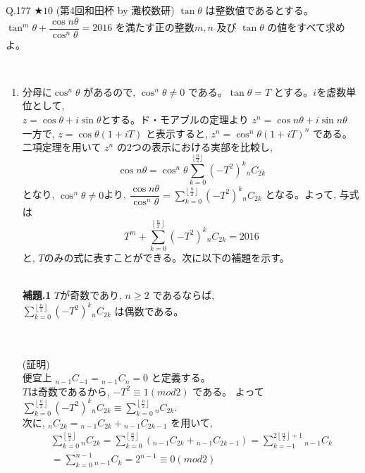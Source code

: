 \documentclass[twocolumn]{jsarticle}
\newcommand{\thm}{\begin{itembox}[l]}
\newcommand{\enthm}{\end{itembox}\\}
\begin{document}
\thm{Q.177 $\bigstar 10$ (第4回和田杯 by 灘校数研)}
$\tan{\theta}$ は整数値であるとする。\\
$\tan^m{\theta}+\dfrac{\cos{n\theta}}{\cos^n{\theta}}=2016$ を満たす正の整数$m,n$ 及び $\tan{\theta}$ の値をすべて求めよ。
\enthm
\begin{enumerate}
\item[]
分母に$\cos^n{\theta}$ があるので, $\cos^n{\theta}\neq 0$ である。$\tan{\theta}=T$ とする。$i$を虚数単位として,\\
$z=\cos{\theta}+i\sin{\theta}$とする。ド・モアブルの定理より $z^n=\cos{n\theta}+i\sin{n\theta}$\\
一方で, $z=\cos{\theta}\left(1+iT\right)$ と表示すると, $z^n=\cos^n{\theta}\left(1+iT \right)^n $ である。\\
二項定理を用いて $z^n$ の2つの表示における実部を比較し,
\[\cos{n\theta}=\cos^n{\theta}\displaystyle\sum_{k=0}^{\lfloor\frac{n}{2}\rfloor} (-T^2)^k{}_nC_{2k}\]
となり, $\cos^n{\theta}\neq 0$より, $\dfrac{\cos{n\theta}}{\cos^n{\theta}} = \displaystyle\sum_{k=0}^{\left\lfloor\frac{n}{2}\right\rfloor} (-T^2)^k{}_nC_{2k}$ となる。よって, 与式は
\[T^m+\displaystyle\sum_{k=0}^{\left\lfloor\frac{n}{2}\right\rfloor} (-T^2)^k{}_nC_{2k}=2016\] と, $T$のみの式に表すことができる。次に以下の補題を示す。\\
\\
\thm{{\bf 補題.1}}
 $T$が奇数であり, $n\ge 2$ であるならば, \\
$\displaystyle\sum_{k=0}^{\left\lfloor\frac{n}{2}\right\rfloor} (-T^2)^k{}_nC_{2k}$ は偶数である。
\enthm
\\
(証明)\\
便宜上 ${}_{n-1}C_{-1}={}_{n-1}C_{n}=0$ と定義する。\\
$T$は奇数であるから, $-T^2\equiv 1 (mod 2)$ である。 よって $\displaystyle\sum_{k=0}^{\left\lfloor\frac{n}{2}\right\rfloor} (-T^2)^k{}_nC_{2k}\equiv \displaystyle\sum_{k=0}^{\left\lfloor\frac{n}{2}\right\rfloor} {}_nC_{2k}$.\\
次に, ${}_nC_{2k} ={}_{n-1}C_{2k}+{}_{n-1}C_{2k-1}$ を用いて, 
\begin{eqnarray*}
 \displaystyle\sum_{k=0}^{\left\lfloor\frac{n}{2}\right\rfloor} {}_nC_{2k} =\displaystyle\sum_{k=0}^{\left\lfloor\frac{n}{2}\right\rfloor} ({}_{n-1}C_{2k}+{}_{n-1}C_{2k-1} )= \displaystyle\sum_{k=-1}^{2\left\lfloor\frac{n}{2} \right\rfloor +1} {}_{n-1}C_{k} \\
= \displaystyle\sum_{k=0}^{n-1} {}_{n-1}C_{k} =2^{n-1} \equiv 0 (mod 2)
\end{eqnarray*}

\end{enumerate}
\end{document}
